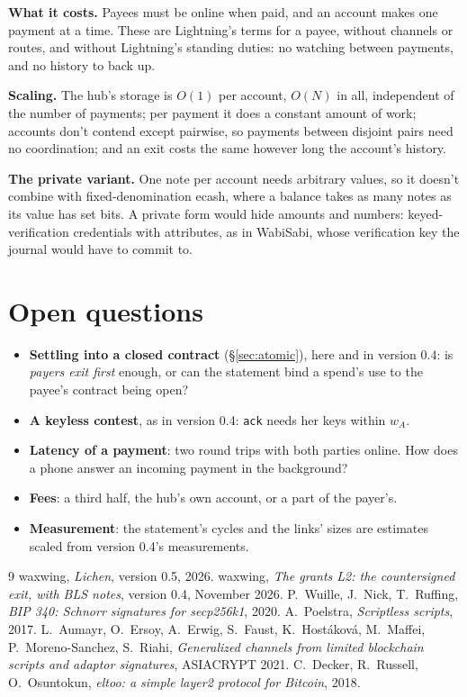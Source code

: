 \documentclass[11pt]{article}
\theoremstyle{plain}
\theoremstyle{definition}
\newcommand{\tx}[1]{\texttt{#1}}
\begin{document}
\textbf{What it costs.} Payees must be online when paid, and an account
makes one payment at a time. These are Lightning's terms for a payee,
without channels or routes, and without Lightning's standing duties:
no watching between payments, and no history to back up.

\textbf{Scaling.} The hub's storage is $O(1)$ per account, $O(N)$ in
all, independent of the number of payments; per payment it does a
constant amount of work; accounts don't contend except
pairwise, so payments between disjoint pairs need no coordination; and
an exit costs the same however long the account's history.

\textbf{The private variant.} One note per account needs arbitrary
values, so it doesn't combine with fixed-denomination ecash, where a
balance takes as many notes as its value has set bits. A private form
would hide amounts and numbers: keyed-verification credentials with
attributes, as in WabiSabi, whose verification key the journal would
have to commit to.

\section{Open questions}\label{sec:open}

\begin{itemize}[nosep]
\item \textbf{Settling into a closed contract} (\S\ref{sec:atomic}),
  here and in version 0.4: is \emph{payers exit first} enough, or can
  the statement bind a spend's use to the payee's contract being open?
\item \textbf{A keyless contest}, as in version 0.4: \tx{ack} needs her
  keys within $w_A$.
\item \textbf{Latency of a payment}: two round trips with both parties
  online. How does a phone answer an incoming payment in the background?
\item \textbf{Fees}: a third half, the hub's own account, or a part of
  the payer's.
\item \textbf{Measurement}: the statement's cycles and the links' sizes
  are estimates scaled from version 0.4's measurements.
\end{itemize}

\begin{thebibliography}{9}
 waxwing, \emph{Lichen}, version 0.5, 2026.
 waxwing, \emph{The grants L2: the countersigned exit,
  with BLS notes}, version 0.4, November 2026.
 P.~Wuille, J.~Nick, T.~Ruffing, \emph{BIP 340: Schnorr
  signatures for secp256k1}, 2020.
 A.~Poelstra, \emph{Scriptless scripts}, 2017.
 L.~Aumayr, O.~Ersoy, A.~Erwig, S.~Faust,
  K.~Hostáková, M.~Maffei, P.~Moreno-Sanchez, S.~Riahi,
  \emph{Generalized channels from limited blockchain scripts and
  adaptor signatures}, ASIACRYPT 2021.
 C.~Decker, R.~Russell, O.~Osuntokun, \emph{eltoo: a
  simple layer2 protocol for Bitcoin}, 2018.
\end{thebibliography}
\end{document}

